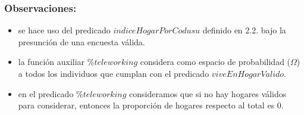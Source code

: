     \subsubsection{Observaciones:}
        \begin{itemize}
            \item se hace uso del predicado $indiceHogarPorCodusu$ definido en 2.2. bajo la presunci\'on de una encuesta v\'alida.
            \item la funci\'on auxiliar ${\%}teleworking$ considera como espacio de probabilidad ($\Omega$) a todos los individuos que cumplan 
            con el predicado $viveEnHogarValido$.
            \item en el predicado $\%teleworking$ consideramos que si no hay hogares v\'alidos para considerar, entonces la proporción de hogares  respecto al total es 0.
        \end{itemize}

